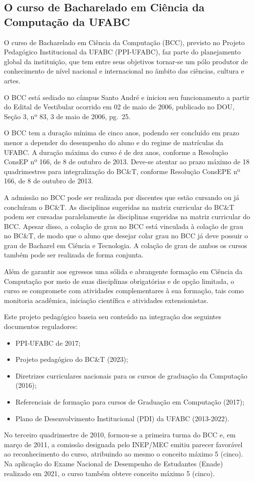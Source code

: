 \subsection{O curso de Bacharelado em Ciência da Computação da UFABC}

O curso de Bacharelado em Ciência da Computação (BCC), previsto no Projeto
Pedagógico Institucional da UFABC (PPI-UFABC), faz parte do planejamento global
da instituição, que tem entre seus objetivos tornar-se um pólo produtor de
conhecimento de nível nacional e internacional no âmbito das ciências, cultura
e artes.

O BCC está sediado no câmpus Santo André e iniciou seu funcionamento a partir
do Edital de Vestibular ocorrido em 02 de maio de 2006, publicado no DOU,
Seção 3, nº 83, 3 de maio de 2006, pg.\ 25.

O BCC tem a duração mínima de cinco anos, podendo ser concluído em prazo menor
a depender do desempenho do aluno e do regime de matrículas da UFABC.
A duração máxima do curso é de dez anos, conforme a Resolução ConsEP nº 166,
de 8 de outubro de 2013.
Deve-se atentar ao prazo máximo de 18 quadrimestres para integralização do
BC\&T, conforme Resolução ConsEPE nº 166, de 8 de outubro de 2013.

A admissão no BCC pode ser realizada por discentes que estão cursando ou já
concluíram o BC\&T.
As disciplinas sugeridas na matriz curricular do BC\&T podem ser cursadas
paralelamente às disciplinas sugeridas na matriz curricular do BCC.
Apesar disso, a colação de grau no BCC está vinculada à colação de grau no
BC\&T, de modo que o aluno que desejar colar grau no BCC já deve possuir o grau
de Bacharel em Ciência e Tecnologia.
A colação de grau de ambos os cursos também pode ser realizada de forma conjunta.

Além de garantir aos egressos uma sólida e abrangente formação em Ciência da
Computação por meio de suas disciplinas obrigatórias e de opção limitada, o
curso se compromete com atividades complementares à sua formação, tais como
monitoria acadêmica, iniciação científica e atividades extensionistas.

Este projeto pedagógico baseia seu conteúdo na integração dos seguintes
documentos reguladores:
\begin{itemize}
    \item PPI-UFABC de 2017;
    \item Projeto pedagógico do BC\&T (2023);
    \item Diretrizes curriculares nacionais para os cursos de graduação da Computação (2016);
    \item Referenciais de formação para cursos de Graduação em Computação (2017);
    \item Plano de Desenvolvimento Institucional (PDI) da UFABC (2013-2022).
\end{itemize}

No terceiro quadrimestre de 2010, formou-se a primeira turma do BCC e, em março
de 2011, a comissão designada pelo INEP/MEC emitiu parecer favorável ao
reconhecimento do curso, atribuindo ao mesmo o conceito máximo 5 (cinco).
Na aplicação do Exame Nacional de Desempenho de Estudantes (Enade) realizado em
2021, o curso também obteve conceito máximo 5 (cinco).
